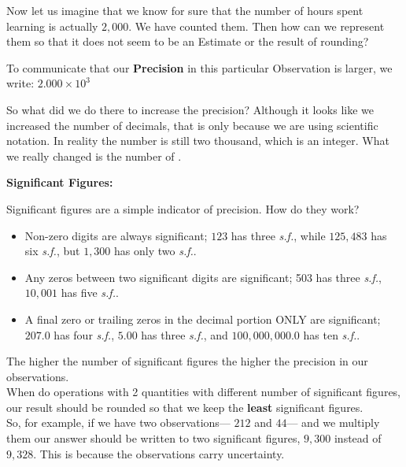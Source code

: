 Now let us imagine that we know for sure that the number of hours spent learning is actually \(2,000\). We have counted them. Then how can we represent them so that it does not seem to be an Estimate or the result of rounding?

To communicate that our \textbf{Precision} in this particular Observation is larger, we write:
\(2.000\times 10^3\)

So what did we do there to increase the precision? Although it looks like we increased the number of decimals, that is only because we are using scientific notation. In reality the number is still two thousand, which is an integer. What we really changed is the number of . 

\vspace{0.5cm}
\begin{center}
\textbf{Significant Figures:}
\end{center}

Significant 
figures are a simple indicator of precision. How do they work?

\begin{adjustwidth}{0cm}{1cm}
\begin{itemize}[noitemsep]
\item Non-zero digits are always significant; \(123\) has three \textit{s.f.}, while \(125,483\) has six \textit{s.f.}, but \(1,300\) has only two \textit{s.f.}.
\item Any zeros between two significant digits are significant; 503 has three \textit{s.f.}, \(10,001\) has five \textit{s.f.}.
\item A final zero or trailing zeros in the decimal portion ONLY are significant; \(207.0\) has four \textit{s.f.}, \(5.00\) has three \textit{s.f.}, and \(100,000,000.0\) has ten \textit{s.f.}.
\end{itemize}
\end{adjustwidth}
\vspace{0.3cm}

\noindent The higher the number of significant figures the higher the precision in our observations.
\\
When do operations with 2 quantities with different number of significant figures, our result should be rounded so that we keep the \textbf{least} significant figures.
\\
So, for example, if we have two observations— \(212\) and \(44\)— and we multiply them our answer should be written to two significant figures, \ie \(9,300\) instead of \(9,328\). This is because the observations carry uncertainty. 


